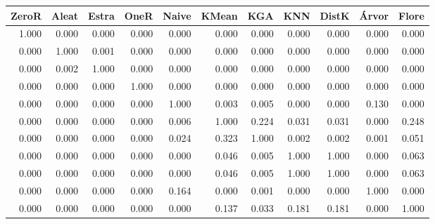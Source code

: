 \begin{table}
\centering
\label{Breast_Cancer_p_value_table}
\begin{tabular}{rrrrrrrrrrr}
\toprule
ZeroR & Aleat & Estra & OneR  & Naive & KMean &   KGA &   KNN & DistK & Árvor & Flore \\
\midrule
1.000 & 0.000 & 0.000 & 0.000 & 0.000 & 0.000 & 0.000 & 0.000 & 0.000 & 0.000 & 0.000 \\
0.000 & 1.000 & 0.001 & 0.000 & 0.000 & 0.000 & 0.000 & 0.000 & 0.000 & 0.000 & 0.000 \\
0.000 & 0.002 & 1.000 & 0.000 & 0.000 & 0.000 & 0.000 & 0.000 & 0.000 & 0.000 & 0.000 \\
0.000 & 0.000 & 0.000 & 1.000 & 0.000 & 0.000 & 0.000 & 0.000 & 0.000 & 0.000 & 0.000 \\
0.000 & 0.000 & 0.000 & 0.000 & 1.000 & 0.003 & 0.005 & 0.000 & 0.000 & 0.130 & 0.000 \\
0.000 & 0.000 & 0.000 & 0.000 & 0.006 & 1.000 & 0.224 & 0.031 & 0.031 & 0.000 & 0.248 \\
0.000 & 0.000 & 0.000 & 0.000 & 0.024 & 0.323 & 1.000 & 0.002 & 0.002 & 0.001 & 0.051 \\
0.000 & 0.000 & 0.000 & 0.000 & 0.000 & 0.046 & 0.005 & 1.000 & 1.000 & 0.000 & 0.063 \\
0.000 & 0.000 & 0.000 & 0.000 & 0.000 & 0.046 & 0.005 & 1.000 & 1.000 & 0.000 & 0.063 \\
0.000 & 0.000 & 0.000 & 0.000 & 0.164 & 0.000 & 0.001 & 0.000 & 0.000 & 1.000 & 0.000 \\
0.000 & 0.000 & 0.000 & 0.000 & 0.000 & 0.137 & 0.033 & 0.181 & 0.181 & 0.000 & 1.000 \\
\bottomrule
\end{tabular}
\end{table}
